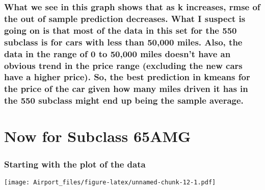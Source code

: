 \documentclass[]{article}
\begin{document}
\hypertarget{what-we-see-in-this-graph-shows-that-as-k-increases-rmse-of-the-out-of-sample-prediction-decreases.-what-i-suspect-is-going-on-is-that-most-of-the-data-in-this-set-for-the-550-subclass-is-for-cars-with-less-than-50000-miles.-also-the-data-in-the-range-of-0-to-50000-miles-doesnt-have-an-obvious-trend-in-the-price-range-excluding-the-new-cars-have-a-higher-price.-so-the-best-prediction-in-kmeans-for-the-price-of-the-car-given-how-many-miles-driven-it-has-in-the-550-subclass-might-end-up-being-the-sample-average.}{%
\subsubsection{What we see in this graph shows that as k increases, rmse
of the out of sample prediction decreases. What I suspect is going on is
that most of the data in this set for the 550 subclass is for cars with
less than 50,000 miles. Also, the data in the range of 0 to 50,000 miles
doesn't have an obvious trend in the price range (excluding the new cars
have a higher price). So, the best prediction in kmeans for the price of
the car given how many miles driven it has in the 550 subclass might end
up being the sample
average.}\label{what-we-see-in-this-graph-shows-that-as-k-increases-rmse-of-the-out-of-sample-prediction-decreases.-what-i-suspect-is-going-on-is-that-most-of-the-data-in-this-set-for-the-550-subclass-is-for-cars-with-less-than-50000-miles.-also-the-data-in-the-range-of-0-to-50000-miles-doesnt-have-an-obvious-trend-in-the-price-range-excluding-the-new-cars-have-a-higher-price.-so-the-best-prediction-in-kmeans-for-the-price-of-the-car-given-how-many-miles-driven-it-has-in-the-550-subclass-might-end-up-being-the-sample-average.}}

\hypertarget{now-for-subclass-65amg}{%
\section{Now for Subclass 65AMG}\label{now-for-subclass-65amg}}

\hypertarget{starting-with-the-plot-of-the-data}{%
\subsubsection{Starting with the plot of the
data}\label{starting-with-the-plot-of-the-data}}

\texttt{[image: Airport\_files/figure-latex/unnamed-chunk-12-1.pdf]}
\end{document}

